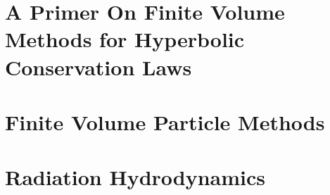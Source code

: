 





\setlength{\parindent}{0pt}
\setlength{\parskip}{0pt} %


\frontmatter



\setcounter{page}{0}

% 



\cleardoublepage
{}
\tableofcontents

%
%


\setlength{\parskip}{1em}

\mainmatter



\part{A Primer On Finite Volume Methods for Hyperbolic Conservation Laws}\label{part:finite-volume}









\part{Finite Volume Particle Methods}\label{part:meshless}







\part{Radiation Hydrodynamics}\label{part:rt}









